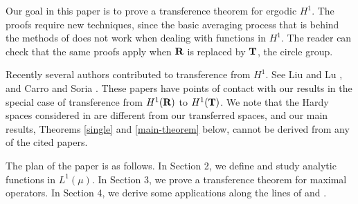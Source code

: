 Our goal in this paper is to prove a transference
theorem for ergodic $H^1$.
The proofs require new 
techniques, since
the basic averaging process that is behind the 
methods of \cite{cw1} does not work when dealing with 
functions in $H^1$.
The reader
can check that the same
proofs apply when $\R$ is replaced
by $\T$, the circle group.  

Recently several authors contributed to 
 transference from $H^1$.
See Liu and Lu \cite{ll}, and Carro and Soria \cite{cs}.
These papers have points of contact with our results
in the special case of
transference from $H^1(\R)$ to $H^1(\T)$.
We note that the Hardy spaces considered in \cite{cs}
are different from 
our transferred spaces, 
and our main results,
Theorems \ref{single} and \ref{main-theorem} below,
cannot be derived from any of the cited papers.

The plan of the paper is as follows. 
In Section 2, we define and study analytic functions in
$L^1(\mu)$.
In Section 3, we prove a 
transference theorem for
 maximal operators.
In Section 4, we derive some 
applications along the lines of
\cite{cw2} and \cite{abg2}.
